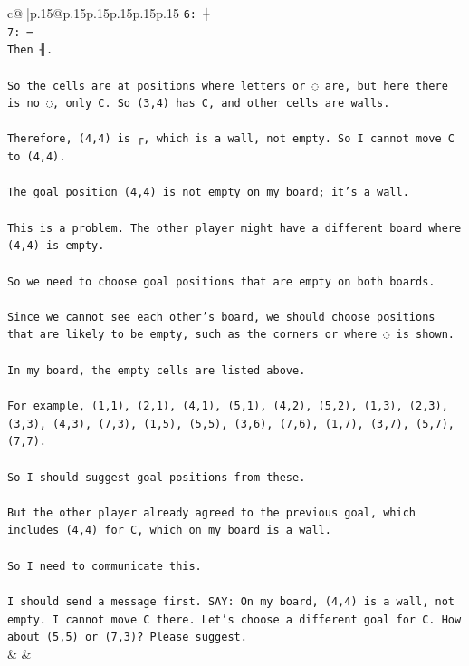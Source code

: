 \documentclass{article}
\begin{document}
{\begin{supertabular}{c@{$\;$}|p{.15\linewidth}@{}p{.15\linewidth}p{.15\linewidth}p{.15\linewidth}p{.15\linewidth}p{.15\linewidth}}
{{{\texttt{6: ┼} \\
\texttt{7: ─} \\
\texttt{Then ╢.} \\
\\ 
\texttt{So the cells are at positions where letters or ◌ are, but here there is no ◌, only C. So (3,4) has C, and other cells are walls.} \\
\\ 
\texttt{Therefore, (4,4) is ┌, which is a wall, not empty. So I cannot move C to (4,4).} \\
\\ 
\texttt{The goal position (4,4) is not empty on my board; it's a wall.} \\
\\ 
\texttt{This is a problem. The other player might have a different board where (4,4) is empty.} \\
\\ 
\texttt{So we need to choose goal positions that are empty on both boards.} \\
\\ 
\texttt{Since we cannot see each other's board, we should choose positions that are likely to be empty, such as the corners or where ◌ is shown.} \\
\\ 
\texttt{In my board, the empty cells are listed above.} \\
\\ 
\texttt{For example, (1,1), (2,1), (4,1), (5,1), (4,2), (5,2), (1,3), (2,3), (3,3), (4,3), (7,3), (1,5), (5,5), (3,6), (7,6), (1,7), (3,7), (5,7), (7,7).} \\
\\ 
\texttt{So I should suggest goal positions from these.} \\
\\ 
\texttt{But the other player already agreed to the previous goal, which includes (4,4) for C, which on my board is a wall.} \\
\\ 
\texttt{So I need to communicate this.} \\
\\ 
\texttt{I should send a message first.      SAY: On my board, (4,4) is a wall, not empty. I cannot move C there. Let's choose a different goal for C. How about (5,5) or (7,3)? Please suggest.} \\
            }
        }
    }
    & & \\ \\


\end{supertabular}}
\end{document}
